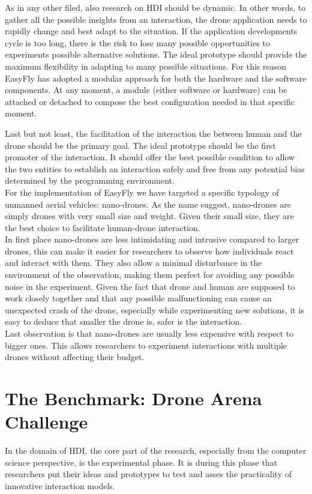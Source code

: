 As in any other filed, also research on HDI should be dynamic. In other words, to gather all the possible
insights from an interaction, the drone application needs to rapidly change and best adapt to the situation.
If the application developments cycle is too long, there is the risk to lose many possible opportunities to
experiments possible alternative solutions. The ideal prototype should provide the maximum flexibility in adapting
to many possible situations.
For this reason EasyFly has adopted a modular approach for both the hardware and the software components.
At any moment, a module (either software or hardware) can be attached or detached to compose the best configuration
needed in that specific moment.

Last but not least, the facilitation of the interaction the between human and the drone should be the primary goal.
The ideal prototype should be the first promoter of the interaction. It should offer the best possible condition to
allow the two entities to establish an interaction safely and free from any potential bias determined by the programming environment.\\
For the implementation of EasyFly we have targeted a specific typology of unmanned aerial vehicles: nano-drones.
As the name suggest, nano-drones are simply drones with very small size and weight. Given their small size,
they are the best choice to facilitate human-drone interaction.\\
In first place nano-drones are less intimidating and intrusive compared to larger drones, this can make it easier for
researchers to observe how individuals react and interact with them. They also allow a minimal disturbance in the
environment of the observation, making them perfect for avoiding any possible noise in the experiment.
Given the fact that drone and human are supposed to work closely together and that any possible malfunctioning can
cause an unexpected crash of the drone, especially while experimenting new solutions, it is easy to deduce that smaller
the drone is, safer is the interaction.\\
Last observation is that nano-drones are usually less expensive with respect to bigger ones. This allows researchers
to experiment interactions with multiple drones without affecting their budget.


\section{The Benchmark: Drone Arena Challenge}\label{sec:the_benchmark}
In the domain of HDI, the core part of the research, especially from the computer science perspective,
is the experimental phase. It is during this phase that researchers put their ideas and prototypes to test
and asses the practicality of innovative interaction models.

